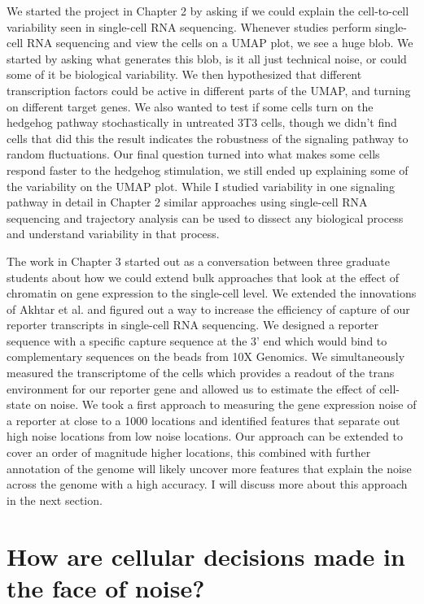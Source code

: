 We started the project in Chapter 2 by asking if we could explain the cell-to-cell variability seen in single-cell RNA sequencing. Whenever studies perform single-cell RNA sequencing and view the cells on a UMAP plot, we see a huge blob. We started by asking what generates this blob, is it all just technical noise, or could some of it be biological variability. We then hypothesized that different transcription factors could be active in different parts of the UMAP, and turning on different target genes. We also wanted to test if some cells turn on the hedgehog pathway stochastically in untreated 3T3 cells, though we didn't find cells that did this the result indicates the robustness of the signaling pathway to random fluctuations. Our final question turned into what makes some cells respond faster to the hedgehog stimulation, we still ended up explaining some of the variability on the UMAP plot. While I studied variability in one signaling pathway in detail in Chapter 2 similar approaches using single-cell RNA sequencing and trajectory analysis can be used to dissect any biological process and understand variability in that process.

The work in Chapter 3 started out as a conversation between three graduate students about how we could extend bulk approaches that look at the effect of chromatin on gene expression to the single-cell level. We extended the innovations of Akhtar et al. \cite{akhtarw_vansteenselb:ChromatinPosition2013} and figured out a way to increase the efficiency of capture of our reporter transcripts in single-cell RNA sequencing. We designed a reporter sequence with a specific capture sequence at the 3' end which would bind to complementary sequences on the beads from 10X Genomics. We simultaneously measured the transcriptome of the cells which provides a readout of the trans environment for our reporter gene and allowed us to estimate the effect of cell-state on noise. We took a first approach to measuring the gene expression noise of a reporter at close to a 1000 locations and identified features that separate out high noise locations from low noise locations. Our approach can be extended to cover an order of magnitude higher locations, this combined with further annotation of the genome will likely uncover more features that explain the noise across the genome with a high accuracy. I will discuss more about this approach in the next section.

\section{How are cellular decisions made in the face of noise?}

